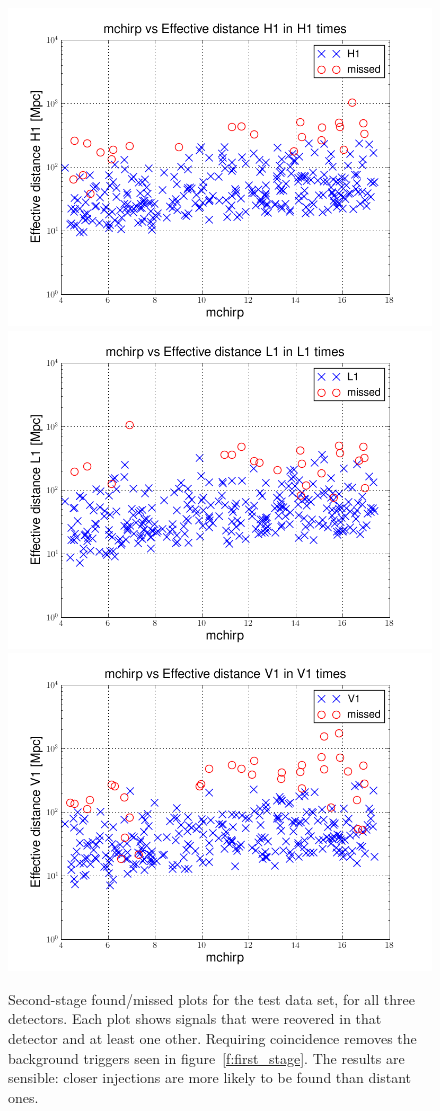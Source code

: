 \begin{figure}
  \includegraphics[width=0.5\linewidth]{figures/ninja2_results/h1-plotinspmissed_full_data_mchirp-eff_dist-log-h1-871147524-606064_second}
  \includegraphics[width=0.5\linewidth]{figures/ninja2_results/l1-plotinspmissed_full_data_mchirp-eff_dist-log-l1-871147524-606064_second} \\
  \includegraphics[width=0.5\linewidth]{figures/ninja2_results/v1-plotinspmissed_full_data_mchirp-eff_dist-log-v1-871147524-606064_second}
  \caption[Second-stage found-missed plots for the test data set]{
  \label{f:test_found_missed}
Second-stage found/missed plots for the test data set, for all three
detectors.  Each plot shows signals that were reovered in that
detector and at least one other.  Requiring coincidence removes the
background triggers seen in figure~\ref{f:first_stage}.  The results
are sensible: closer injections are more likely to be found than
distant ones.
}
\end{figure}%


